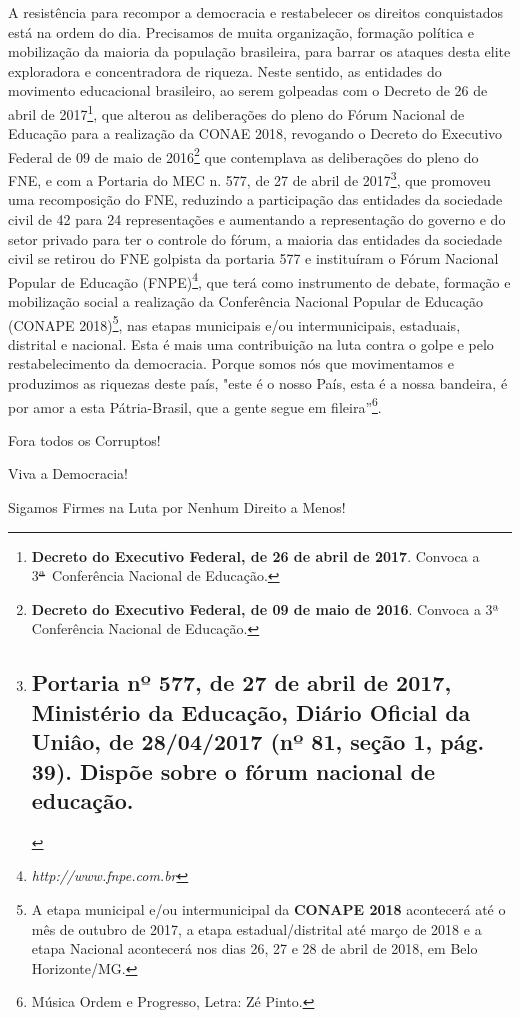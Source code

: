 A resistência para recompor a democracia e restabelecer os direitos
conquistados está na ordem do dia. Precisamos de muita organização,
formação política e mobilização da maioria da população brasileira, para
barrar os ataques desta elite exploradora e concentradora de riqueza.
Neste sentido, as entidades do movimento educacional brasileiro, ao
serem golpeadas com o Decreto de 26 de abril de 2017\footnote{\textbf{Decreto
  do Executivo Federal, de 26 de abril de 2017}. Convoca a
  3\sout{ª}~Conferência Nacional de Educação.}, que alterou as
deliberações do pleno do Fórum Nacional de Educação para a realização da
CONAE 2018, revogando o Decreto do Executivo Federal de 09 de maio de
2016\footnote{\textbf{Decreto do Executivo Federal, de 09 de maio de
  2016}. Convoca a 3ª Conferência Nacional de Educação.} que contemplava
as deliberações do pleno do FNE, e com a Portaria do MEC n. 577, de 27
de abril de 2017\footnote{\section{ Portaria nº 577, de 27 de abril de
  2017, Ministério da Educação, Diário Oficial da Uniâo, de 28/04/2017
  (nº 81, seção 1, pág. 39). Dispõe sobre o fórum nacional de
  educação.}\label{portaria-nuxba-577-de-27-de-abril-de-2017-ministuxe9rio-da-educauxe7uxe3o-diuxe1rio-oficial-da-uniuxe2o-de-28042017-nuxba-81-seuxe7uxe3o-1-puxe1g.-39.-dispuxf5e-sobre-o-fuxf3rum-nacional-de-educauxe7uxe3o.}},
que promoveu uma recomposição do FNE, reduzindo a participação das
entidades da sociedade civil de 42 para 24 representações e aumentando a
representação do governo e do setor privado para ter o controle do
fórum, a maioria das entidades da sociedade civil se retirou do FNE
golpista da portaria 577 e instituíram o Fórum Nacional Popular de
Educação (FNPE)\footnote{\emph{http://www.fnpe.com.br}},
que terá como instrumento de debate, formação e mobilização social a
realização da Conferência Nacional Popular de Educação (CONAPE
2018)\footnote{A etapa municipal e/ou intermunicipal da \textbf{CONAPE
  2018} acontecerá até o mês de outubro de 2017, a etapa
  estadual/distrital até março de 2018 e a etapa Nacional acontecerá nos
  dias 26, 27 e 28 de abril de 2018, em Belo Horizonte/MG.}, nas etapas
municipais e/ou intermunicipais, estaduais, distrital e nacional. Esta é
mais uma contribuição na luta contra o golpe e pelo restabelecimento da
democracia. Porque somos nós que movimentamos e produzimos as riquezas
deste país, "este é o nosso País, esta é a nossa bandeira, é por amor a
esta Pátria-Brasil, que a gente segue em fileira''\footnote{Música Ordem
  e Progresso, Letra: Zé Pinto.}.

Fora todos os Corruptos!

Viva a Democracia!

Sigamos Firmes na Luta por Nenhum Direito a Menos!
